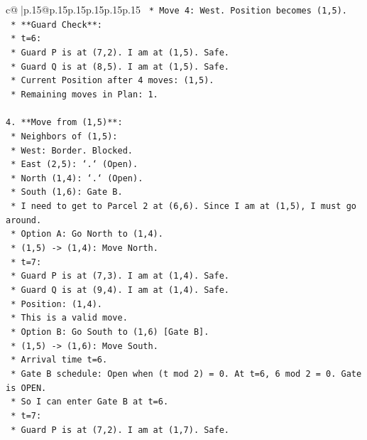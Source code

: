 \documentclass{article}
\begin{document}
{\begin{supertabular}{c@{$\;$}|p{.15\linewidth}@{}p{.15\linewidth}p{.15\linewidth}p{.15\linewidth}p{.15\linewidth}p{.15\linewidth}}
{{{\texttt{    *   Move 4: West. Position becomes (1,5).} \\
\texttt{    *   **Guard Check**:} \\
\texttt{        *   t=6:} \\
\texttt{            *   Guard P is at (7,2). I am at (1,5). Safe.} \\
\texttt{            *   Guard Q is at (8,5). I am at (1,5). Safe.} \\
\texttt{    *   Current Position after 4 moves: (1,5).} \\
\texttt{    *   Remaining moves in Plan: 1.} \\
\\ 
\texttt{4.  **Move from (1,5)**:} \\
\texttt{    *   Neighbors of (1,5):} \\
\texttt{        *   West: Border. Blocked.} \\
\texttt{        *   East (2,5): `.` (Open).} \\
\texttt{        *   North (1,4): `.` (Open).} \\
\texttt{        *   South (1,6): Gate B.} \\
\texttt{    *   I need to get to Parcel 2 at (6,6). Since I am at (1,5), I must go around.} \\
\texttt{    *   Option A: Go North to (1,4).} \\
\texttt{        *   (1,5) {-}> (1,4): Move North.} \\
\texttt{        *   t=7:} \\
\texttt{            *   Guard P is at (7,3). I am at (1,4). Safe.} \\
\texttt{            *   Guard Q is at (9,4). I am at (1,4). Safe.} \\
\texttt{        *   Position: (1,4).} \\
\texttt{        *   This is a valid move.} \\
\texttt{    *   Option B: Go South to (1,6) {[}Gate B{]}.} \\
\texttt{        *   (1,5) {-}> (1,6): Move South.} \\
\texttt{        *   Arrival time t=6.} \\
\texttt{        *   Gate B schedule: Open when (t mod 2) = 0. At t=6, 6 mod 2 = 0. Gate is OPEN.} \\
\texttt{        *   So I can enter Gate B at t=6.} \\
\texttt{        *   t=7:} \\
\texttt{            *   Guard P is at (7,2). I am at (1,7). Safe.} \\
}}}
\end{supertabular}}
\end{document}
